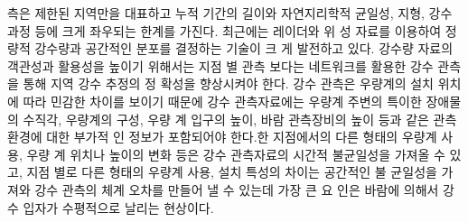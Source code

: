 측은 제한된 지역만을 대표하고 누적 기간의 길이와 자연지리학적 균일성,
지형, 강수 과정 등에 크게 좌우되는 한계를 가진다. 최근에는 레이더와 위
성 자료를 이용하여 정량적 강수량과 공간적인 분포를 결정하는 기술이 크
게 발전하고 있다. 강수량 자료의 객관성과 활용성을 높이기 위해서는 지점
별 관측 보다는 네트워크를 활용한 강수 관측을 통해 지역 강수 추정의 정
확성을 향상시켜야 한다.
강수 관측은 우량계의 설치 위치에 따라 민감한 차이를 보이기 때문에 강수
관측자료에는 우량계 주변의 특이한 장애물의 수직각, 우량계의 구성, 우량
계 입구의 높이, 바람 관측장비의 높이 등과 같은 관측 환경에 대한 부가적
인 정보가 포함되어야 한다.한 지점에서의 다른 형태의 우량계 사용, 우량
계 위치나 높이의 변화 등은 강수 관측자료의 시간적 불균일성을 가져올 수
있고, 지점 별로 다른 형태의 우량계 사용, 설치 특성의 차이는 공간적인 불
균일성을 가져와 강수 관측의 체계 오차를 만들어 낼 수 있는데 가장 큰 요
인은 바람에 의해서 강수 입자가 수평적으로 날리는 현상이다.

